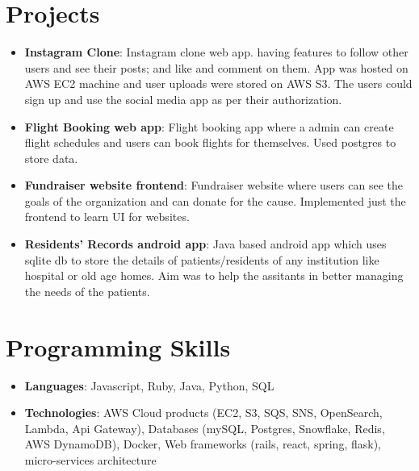 \documentclass[a4paper,11pt]{article}
\newcommand{\resumeItem}[2]{
  \item\small{
    \textbf{#1}{: #2 \vspace{-2pt}}
  }
}
\newcommand{\resumeSubItem}[2]{\resumeItem{#1}{#2}\vspace{-4pt}}
\newcommand{\resumeSubHeadingListStart}{\begin{itemize}[leftmargin=*]}
\newcommand{\resumeSubHeadingListEnd}{\end{itemize}}
\newcommand{\resumeItemListStart}{\begin{itemize}}
\newcommand{\resumeItemListEnd}{\end{itemize}\vspace{-5pt}}
\begin{document}
\section{Projects}
  \resumeSubHeadingListStart
    \resumeSubItem{Instagram Clone}
      {Instagram clone web app. having features to follow other users and see their posts; and like and comment on them. App was hosted on AWS EC2 machine and user uploads were stored on AWS S3. The users could sign up and use the social media app as per their authorization.}
    \resumeSubItem{Flight Booking web app}
      {Flight booking app where a admin can create flight schedules and users can book flights for themselves. Used postgres to store data.}
    \resumeSubItem{Fundraiser website frontend}
      {Fundraiser website where users can see the goals of the organization and can donate for the cause. Implemented just the frontend to learn UI for websites.}
    \resumeSubItem{Residents' Records android app}
      {Java based android app which uses sqlite db to store the details of patients/residents of any institution like hospital or old age homes. Aim was to help the assitants in better managing the needs of the patients.}
  \resumeSubHeadingListEnd





\section{Programming Skills}
  \resumeItemListStart
    \resumeItem{Languages}
      {Javascript, Ruby, Java, Python, SQL}
    \resumeItem{Technologies}
      {AWS Cloud products (EC2, S3, SQS, SNS, OpenSearch, Lambda, Api Gateway), Databases (mySQL, Postgres, Snowflake, Redis, AWS DynamoDB), Docker, Web frameworks (rails, react, spring, flask), micro-services architecture}
  \resumeItemListEnd





\end{document}
